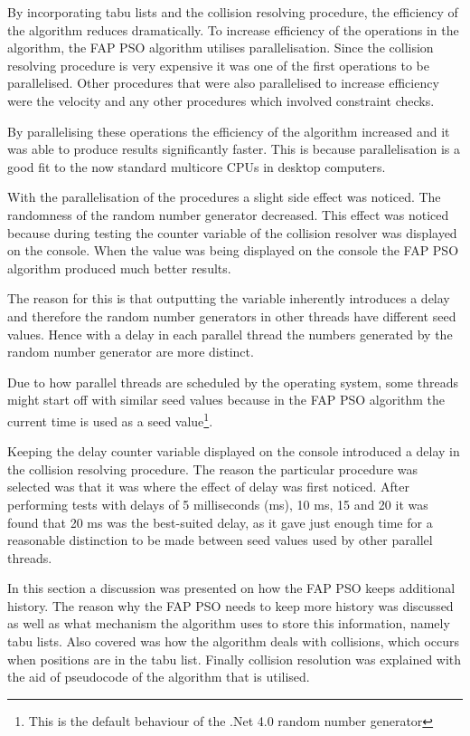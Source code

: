 By incorporating tabu lists and the collision resolving procedure, the efficiency of the algorithm reduces dramatically. To increase efficiency of the operations in the algorithm, the FAP PSO algorithm utilises parallelisation. Since the collision resolving procedure is very expensive it was one of the first operations to be parallelised. Other procedures that were also parallelised to increase efficiency were the velocity and any other procedures which involved constraint checks.

By parallelising these operations the efficiency of the algorithm increased and it was able to produce results significantly faster. This is because parallelisation is a good fit to the now standard multicore CPUs in desktop computers.

With the parallelisation of the procedures a slight side effect was noticed. The randomness of the random number generator decreased. This effect was noticed because during testing the counter variable of the collision resolver was displayed on the console. When the value was being displayed on the console the FAP PSO algorithm produced much better results. 

The reason for this is that outputting the variable inherently introduces a delay and therefore the random number generators in other threads have different seed values. Hence with a delay in each parallel thread the numbers generated by the random number generator are more distinct. 

Due to how parallel threads are scheduled by the operating system, some threads might start off with similar seed values because in  the FAP PSO algorithm the current time is used as a seed value\footnote{This is the default behaviour of the .Net 4.0 random number generator}.

Keeping the delay counter variable displayed on the console introduced a delay in the collision resolving procedure. The reason the particular procedure was selected was that it was where the effect of delay was first noticed. After performing tests with delays of 5 milliseconds (ms), 10 ms, 15 and 20 it was found that 20 ms was the best-suited delay, as it gave just enough time for a reasonable distinction to be made between seed values used by other parallel threads.

In this section a discussion was presented on how the FAP PSO keeps additional history. The reason why the FAP PSO needs to keep more history was discussed as well as what mechanism the algorithm uses to store this information, namely tabu lists. Also covered was how the algorithm deals with collisions, which occurs when positions are in the tabu list. Finally collision resolution was explained with the aid of pseudocode of the algorithm that is utilised.

